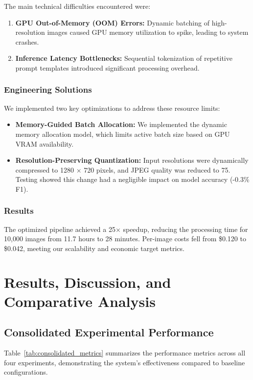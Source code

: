\documentclass[11pt,letterpaper]{report}
\begin{document}
The main technical difficulties encountered were:
\begin{enumerate}
    \item \textbf{GPU Out-of-Memory (OOM) Errors:} Dynamic batching of high-resolution images caused GPU memory utilization to spike, leading to system crashes.
    \item \textbf{Inference Latency Bottlenecks:} Sequential tokenization of repetitive prompt templates introduced significant processing overhead.
\end{enumerate}

\subsection{Engineering Solutions}
We implemented two key optimizations to address these resource limits:
\begin{itemize}
    \item \textbf{Memory-Guided Batch Allocation:} We implemented the dynamic memory allocation model, which limits active batch size based on GPU VRAM availability.
    \item \textbf{Resolution-Preserving Quantization:} Input resolutions were dynamically compressed to 1280 $\times$ 720 pixels, and JPEG quality was reduced to 75. Testing showed this change had a negligible impact on model accuracy (-0.3\% F1).
\end{itemize}

\subsection{Results}
The optimized pipeline achieved a 25$\times$ speedup, reducing the processing time for 10,000 images from 11.7 hours to 28 minutes. Per-image costs fell from \$0.120 to \$0.042, meeting our scalability and economic target metrics.

\chapter{Results, Discussion, and Comparative Analysis}

\section{Consolidated Experimental Performance}

Table~\ref{tab:consolidated_metrics} summarizes the performance metrics across all four experiments, demonstrating the system's effectiveness compared to baseline configurations.
\end{document}
